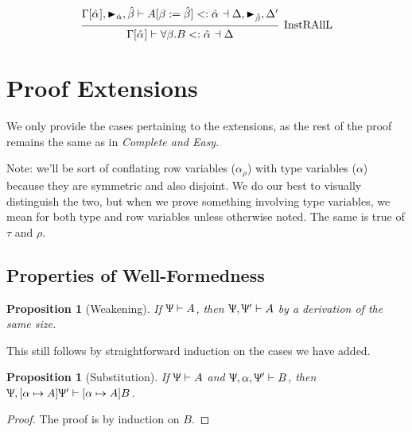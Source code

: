 \documentclass{article}
\newtheorem{prop}[thm]{Proposition}
\newcommand{\declCtx}{\Uppsi}
\newcommand{\rcd}[1]{\{#1\}}
\newcommand{\rowall}{\rotatebox[origin=c]{180}{\(\mathsf{R}\)}}
\newcommand{\rowvar}{\alpha_\rho}
\newcommand{\marker}[1]{\RHD_{#1}}
\newcommand{\subsume}{<:}
\newcommand{\ev}{\hat}
\newcommand{\eva}[1][]{\ev \alpha_{#1}}
\newcommand{\evb}{\ev \beta}
\newcommand{\wf}[2]{#1 \vdash #2}
\newcommand{\subsumes}[4]{#1 \vdash #2 \subsume #3 \dashv #4}
\newcommand{\deduct}[3][]
{
  \begin{prooftree}
    \hypo{#2}
    \infer1[\text{#1}]{#3}
  \end{prooftree}
}
\begin{document}
\[
  \deduct[InstRAllL]
  { \subsumes{\Gamma[\eva], \marker{\ev\alpha}, \evb}{A[\beta := \evb]}{\eva}{\Delta, \marker{\evb}, \Delta'} }
  { \subsumes{\Gamma[\eva]}{\forall \beta. B}{\eva}{\Delta} }
\]


\section{Proof Extensions}

We only provide the cases pertaining to the extensions, as the rest of the proof
remains the same as in \textit{Complete and Easy}.

Note: we'll be sort of conflating row variables (\(\rowvar\)) with type
variables (\(\alpha\)) because they are symmetric and also disjoint. We do our
best to visually distinguish the two, but when we prove something involving type
variables, we mean for both type and row variables unless otherwise noted. The
same is true of \(\tau\) and \(\rho\).

\subsection{Properties of Well-Formedness}
\begin{prop}[Weakening]
  If \(\wf \declCtx A\), then \(\wf {\declCtx, \declCtx'} A\) by a derivation of
  the same size.
\end{prop}

This still follows by straightforward induction on the cases we have added.

\begin{prop}[Substitution]
  If \(\wf \declCtx A\) and \(\wf {\declCtx, \alpha, \declCtx'} B\), then \(\wf
  {\declCtx, [\alpha \mapsto A] \declCtx'} {[\alpha \mapsto A] B}\).
\end{prop}

\begin{proof}
The proof is by induction on \(B\).
\end{proof}
\end{document}

